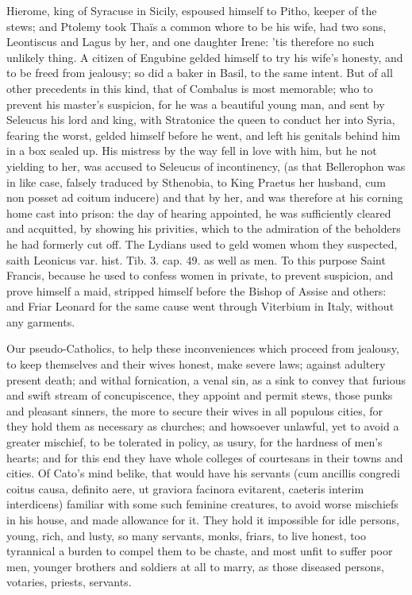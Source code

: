 { Hierome, king of Syracuse in Sicily, espoused himself to Pitho,
keeper of the stews; and Ptolemy took Thaïs a common whore to be his
wife, had two sons, Leontiscus and Lagus by her, and one daughter
Irene: 'tis therefore no such unlikely thing. A citizen of
Engubine gelded himself to try his wife's honesty, and to be freed from
jealousy; so did a baker in  Basil, to the same intent. But of
all other precedents in this kind, that of Combalus is most
memorable; who to prevent his master's suspicion, for he was a
beautiful young man, and sent by Seleucus his lord and king, with
Stratonice the queen to conduct her into Syria, fearing the worst,
gelded himself before he went, and left his genitals behind him in a
box sealed up. His mistress by the way fell in love with him, but he
not yielding to her, was accused to Seleucus of incontinency, (as that
Bellerophon was in like case, falsely traduced by Sthenobia, to King
Praetus her husband, cum non posset ad coitum inducere) and that by
her, and was therefore at his corning home cast into prison: the day of
hearing appointed, he was sufficiently cleared and acquitted, by
showing his privities, which to the admiration of the beholders he had
formerly cut off. The Lydians used to geld women whom they suspected,
saith Leonicus var. hist. Tib. 3. cap. 49. as well as men. To this
purpose Saint Francis, because he used to confess women in
private, to prevent suspicion, and prove himself a maid, stripped
himself before the Bishop of Assise and others: and Friar Leonard for
the same cause went through Viterbium in Italy, without any garments.

Our pseudo-Catholics, to help these inconveniences which proceed from
jealousy, to keep themselves and their wives honest, make severe laws;
against adultery present death; and withal fornication, a venal sin, as
a sink to convey that furious and swift stream of concupiscence, they
appoint and permit stews, those punks and pleasant sinners, the more to
secure their wives in all populous cities, for they hold them as
necessary as churches; and howsoever unlawful, yet to avoid a greater
mischief, to be tolerated in policy, as usury, for the hardness of
men's hearts; and for this end they have whole colleges of courtesans
in their towns and cities. Of Cato's mind belike, that would have
his servants (cum ancillis congredi coitus causa, definito aere, ut
graviora facinora evitarent, caeteris interim interdicens) familiar
with some such feminine creatures, to avoid worse mischiefs in his
house, and made allowance for it. They hold it impossible for idle
persons, young, rich, and lusty, so many servants, monks, friars, to
live honest, too tyrannical a burden to compel them to be chaste, and
most unfit to suffer poor men, younger brothers and soldiers at all to
marry, as those diseased persons, votaries, priests, servants.

}
